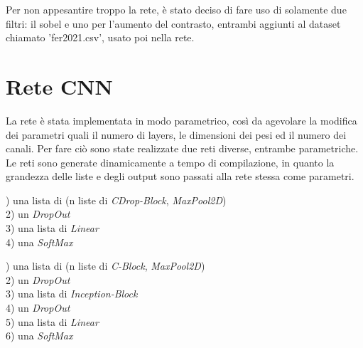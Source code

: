 \documentclass[target=mst]{thud}
\begin{document}
Per non appesantire troppo la rete, è stato deciso di fare uso di solamente due filtri: il sobel e uno per l'aumento del contrasto, entrambi aggiunti al dataset chiamato 'fer2021.csv', usato poi nella rete.


\chapter{Rete CNN}
La rete è stata implementata in modo parametrico, così da agevolare la modifica dei parametri quali il numero di layers, le dimensioni dei pesi ed il numero dei canali.
Per fare ciò sono state realizzate due reti diverse, entrambe parametriche.
Le reti sono generate dinamicamente a tempo di compilazione, in quanto la grandezza delle liste e degli output sono passati alla rete stessa come parametri.

\begin{multicols}{2}

) una lista di (n liste di \textit{CDrop-Block}, \textit{MaxPool2D}) \\%
2) un \textit{DropOut}\\
3) una lista di \textit{Linear}\\
4) una \textit{SoftMax}

\columnbreak

) una lista di (n liste di \textit{C-Block}, \textit{MaxPool2D}) \\%
2) un \textit{DropOut}\\
3) una lista di \textit{Inception-Block} \\%
4) un \textit{DropOut}\\
5) una lista di \textit{Linear}\\
6) una \textit{SoftMax}
\end{multicols}
\end{document}
